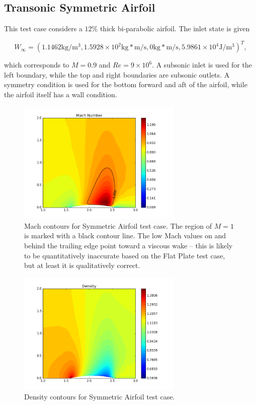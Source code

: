 \documentclass{article}
\begin{document}
\newpage
\subsection{Transonic Symmetric Airfoil}
This test case considers a $12\%$ thick bi-parabolic airfoil. The inlet state is given

\begin{equation*}
W_{\infty} = (1.1462 \text{kg}/\text{m}^3,1.5928\times10^2\text{kg}*\text{m}/\text{s},0\text{kg}*\text{m}/\text{s},5.9861\times10^4\text{J}/\text{m}^3)^T,
\end{equation*}

which corresponds to $M=0.9$ and $Re=9\times10^6$. A subsonic inlet is used for the left boundary, while the top and right boundaries are subsonic outlets. A symmetry condition is used for the bottom forward and aft of the airfoil, while the airfoil itself has a wall condition.

\begin{figure}[!ht]
\centering
\includegraphics[width=0.7\textwidth]{images/airfoil_mach.png}
\caption{Mach contours for Symmetric Airfoil test case. The region of $M=1$ is marked with a black contour line. The low Mach values on and behind the trailing edge point toward a viscous wake -- this is likely to be quantitatively inaccurate based on the Flat Plate test case, but at least it is qualitatively correct.}
\label{fig:airfoil_mach}
\end{figure}

\begin{figure}[!ht]
\centering
\includegraphics[width=0.7\textwidth]{images/airfoil_density.png}
\caption{Density contours for Symmetric Airfoil test case. }
\label{fig:airfoil_density}
\end{figure}
\end{document}
